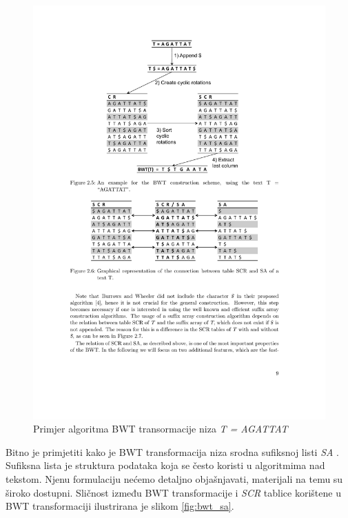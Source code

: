 \documentclass[times, utf8, seminar, numeric]{fer}
\begin{document}
\begin{figure}[!htb]
\centering
\includegraphics{fig/bwt.pdf}
\caption{Primjer algoritma BWT transormacije niza \textit{T = AGATTAT}}
\label{fig:bwt}
\end{figure}

Bitno je primjetiti kako je BWT transformacija niza srodna sufiksnoj listi \textit{SA} . Sufiksna lista
je struktura podataka koja se često koristi u algoritmima nad tekstom. Njenu formulaciju
nećemo detaljno objašnjavati, materijali na temu su široko dostupni. Sličnost između BWT
transformacije i \textit{SCR} tablice korištene u BWT transformaciji ilustrirana je slikom \ref{fig:bwt_sa}.
\end{document}
